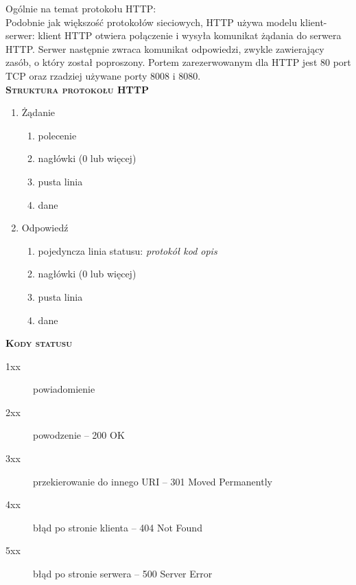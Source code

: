 \vspace{0.2cm}
\noindent
Ogólnie na temat protokołu HTTP: \\
Podobnie jak większość protokołów sieciowych, HTTP używa modelu klient-serwer: klient HTTP otwiera połączenie i wysyła komunikat żądania do serwera HTTP. Serwer następnie zwraca komunikat odpowiedzi, zwykle zawierający zasób, o który został poproszony.
Portem zarezerwowanym dla HTTP jest 80 port TCP oraz rzadziej używane porty 8008 i 8080.\\

\textsc{\textbf{Struktura protokołu HTTP}}

\begin{enumerate}
\item Żądanie
	\begin{enumerate}
	\item{polecenie}
	\item{nagłówki (0 lub więcej)}
	\item pusta linia
	\item dane
	\end{enumerate}
\item Odpowiedź
	\begin{enumerate}
		\item pojedyncza linia statusu: \textit{protokół kod opis}
		\item{nagłówki (0 lub więcej)}
		\item pusta linia
		\item dane
	\end{enumerate}
\end{enumerate}


\textsc{\textbf{Kody statusu}}

\begin{description}
\item[1xx] powiadomienie
\item[2xx] powodzenie – 200 OK
\item[3xx] przekierowanie do innego URI – 301 Moved Permanently
\item[4xx] błąd po stronie klienta – 404 Not Found
\item[5xx] błąd po stronie serwera – 500 Server Error
\end{description}

